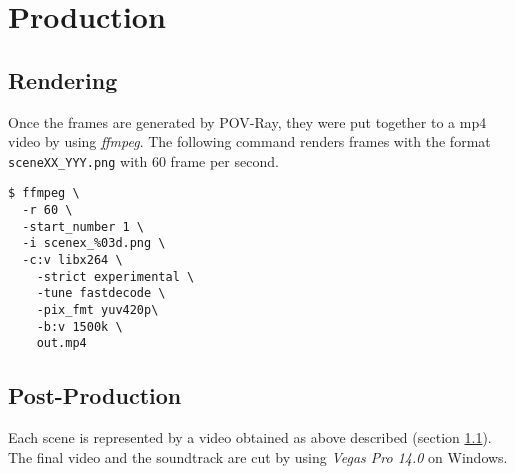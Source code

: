 \chapter{Production}

\section{Rendering} \label{rendering}
Once the frames are generated by POV-Ray, they were put together to a mp4 video by using \textit{ffmpeg}.
The following command renders frames with the format \texttt{sceneXX\_YYY.png} with 60 frame per second.

\begin{lstlisting}
$ ffmpeg \
  -r 60 \
  -start_number 1 \
  -i scenex_%03d.png \
  -c:v libx264 \
	-strict experimental \
	-tune fastdecode \
	-pix_fmt yuv420p\
	-b:v 1500k \
	out.mp4

\end{lstlisting}

\section{Post-Production}

Each scene is represented by a video obtained as above described (section \ref{rendering}). The final video and the soundtrack are cut by using \textit{Vegas Pro 14.0} \cite{VegasPro} on Windows.
